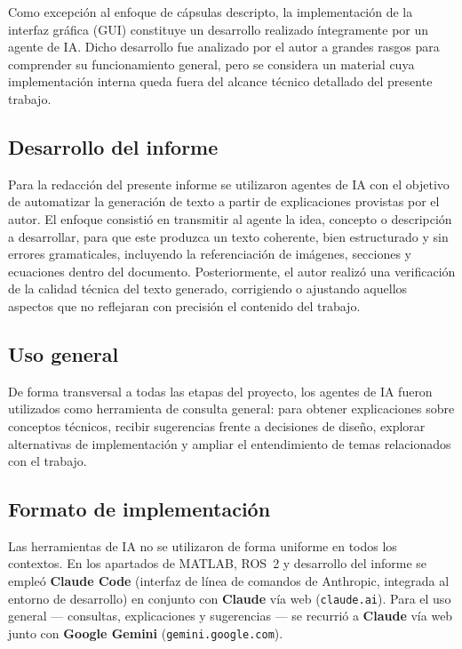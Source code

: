 \documentclass{article}
\begin{document}
Como excepción al enfoque de cápsulas descripto, la implementación de la interfaz gráfica (GUI) constituye un desarrollo realizado íntegramente por un agente de IA. Dicho desarrollo fue analizado por el autor a grandes rasgos para comprender su funcionamiento general, pero se considera un material cuya implementación interna queda fuera del alcance técnico detallado del presente trabajo.

\subsection{Desarrollo del informe}


Para la redacción del presente informe se utilizaron agentes de IA con el objetivo de automatizar la generación de texto a partir de explicaciones provistas por el autor. El enfoque consistió en transmitir al agente la idea, concepto o descripción a desarrollar, para que este produzca un texto coherente, bien estructurado y sin errores gramaticales, incluyendo la referenciación de imágenes, secciones y ecuaciones dentro del documento. Posteriormente, el autor realizó una verificación de la calidad técnica del texto generado, corrigiendo o ajustando aquellos aspectos que no reflejaran con precisión el contenido del trabajo.

\subsection{Uso general}

De forma transversal a todas las etapas del proyecto, los agentes de IA fueron utilizados como herramienta de consulta general: para obtener explicaciones sobre conceptos técnicos, recibir sugerencias frente a decisiones de diseño, explorar alternativas de implementación y ampliar el entendimiento de temas relacionados con el trabajo.

\subsection{Formato de implementación}

Las herramientas de IA no se utilizaron de forma uniforme en todos los contextos. En los apartados de MATLAB, ROS~2 y desarrollo del informe se empleó \textbf{Claude Code} (interfaz de línea de comandos de Anthropic, integrada al entorno de desarrollo) en conjunto con \textbf{Claude} vía web (\texttt{claude.ai}). Para el uso general --- consultas, explicaciones y sugerencias --- se recurrió a \textbf{Claude} vía web junto con \textbf{Google Gemini} (\texttt{gemini.google.com}).
\end{document}
